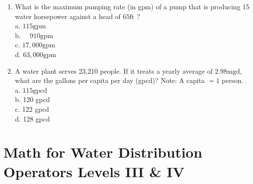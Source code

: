 \documentclass[10pt]{article}
\begin{document}
\begin{enumerate}
  \item What is the maximum pumping rate (in gpm) of a pump that is producing 15 water horsepower against a head of $65 \mathrm{ft}$ ?\\
a. $115 \mathrm{gpm}$\\
b. $\quad 910 \mathrm{gpm}$\\
c. $17,000 \mathrm{gpm}$\\
d. $63,000 \mathrm{gpm}$

  \item A water plant serves 23,210 people. If it treats a yearly average of $2.98 \mathrm{mgd}$, what are the gallons per capita per day (gpcd)? Note: A capita $=1$ person.\\
a. $115 \mathrm{gpcd}$\\
b. 120 gpcd\\
c. 122 gpcd\\
d. 128 gpcd

\end{enumerate}

\section{Math for Water Distribution Operators Levels III \& IV}
\end{document}
